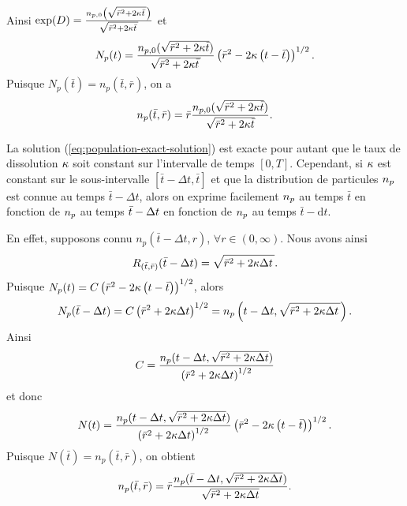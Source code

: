 Ainsi
$\exp(D) = \frac{n_{p,0}\left( \sqrt{\bar r^2 + 2\kappa \bar t\,} \right)}{\sqrt{\bar r^2 + 2\kappa \bar t\,}}$
et
\begin{equation*}
  N_p(t) = \frac{n_{p,0}(\sqrt{\bar r^2 + 2\kappa \bar
      t})}{\sqrt{\bar r^2 + 2\kappa \bar t\,}}\left( \bar r^2 -
    2\kappa \left( t - \bar t \right) \right)^{1/2}.
\end{equation*}
Puisque $N_p(\bar t) = n_p(\bar t, \bar r)$, on a
\begin{equation}\label{eq:population-exact-solution}
  n_p(\bar t, \bar r) = \bar r\frac{n_{p,0}(\sqrt{\bar r^2 +
      2\kappa \bar t})}{\sqrt{\bar r^2+2\kappa \bar t}}.
\end{equation}

\begin{remarque}\label{rem:population-exact-step}
  La solution (\ref{eq:population-exact-solution}) est exacte pour
  autant que le taux de dissolution $\kappa$ soit constant
  sur l'intervalle de temps $[0, T]$. Cependant, si $\kappa$
  est constant sur le sous-intervalle $[\bar t - \Delta t, \bar t]$ et
  que la distribution de particules $n_p$ est connue au temps
  $\bar t - \Delta t$, alors on exprime facilement $n_p$ au
  temps $\bar t$ en fonction de $n_p$ au temps $\bar t - \Delta t$
  en fonction de $n_p$ au temps $\bar t - \mathrm dt$.

  En effet, supposons connu $n_p(\bar t - \Delta t, r)$, $\forall
  r\in (0, \infty)$. Nous avons ainsi
  \begin{equation*}
    R_{(\bar t, \bar r)}(\bar t - \Delta t) = \sqrt{\bar r^2 +
      2\kappa \Delta t\,}.
  \end{equation*}
  Puisque $N_p(t) = C\left( \bar r^2 - 2\kappa\left( t -
      \bar t \right) \right)^{1/2}$, alors
  \begin{equation*}
N_p(\bar t - \Delta t) = C\left( \bar r^2 + 2\kappa \Delta
  t \right)^{1/2} = n_p\left( t - \Delta t, \sqrt{\bar r^2 + 2\kappa
    \Delta t\,} \right).
  \end{equation*}
  Ainsi
  \begin{equation*}
    C = \frac{n_p(t - \Delta t, \sqrt{\bar r^2 + 2\kappa
        \Delta t})}{\left( \bar r^2 + 2\kappa\Delta t \right)^{1/2}}
  \end{equation*}
  et donc
  \begin{equation*}
    N(t) = \frac{n_p(t - \Delta t, \sqrt{\bar r^2 + 2\kappa
        \Delta t})}{\left( \bar r^2 + 2\kappa\Delta t \right)^{1/2}}\left( \bar
      r^2 - 2\kappa\left( t - \bar t \right) \right)^{1/2}.
  \end{equation*}
  Puisque $N(\bar t) = n_p(\bar t, \bar r)$, on obtient
  \begin{equation*}
    n_p(\bar t, \bar r) = \bar r\frac{n_p(\bar t - \Delta t, \sqrt{\bar
        r^2 + 2\kappa \Delta t})}{\sqrt{\bar r^2 +
        2\kappa \Delta t}}.
  \end{equation*}
\end{remarque}

